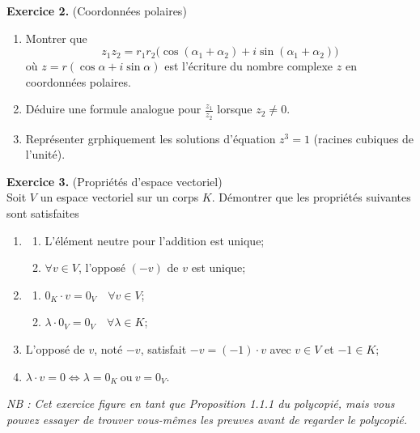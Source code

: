 \documentclass[a4paper, 10pt]{report}
\begin{document}
	\vspace{5mm}
	\noindent
	\textbf{Exercice 2.} (Coordonnées polaires)
	
	\begin{enumerate}[label=(\alph*)]
		\item Montrer que
		\[
			z_1z_2 = r_1r_2\big(\cos(\alpha_1 + \alpha_2)
				+ i\sin(\alpha_1 + \alpha_2)\big)
		\]
		où $z = r(\cos\alpha + i \sin\alpha)$ est l'écriture du
		nombre complexe $z$ en coordonnées polaires.
		\item Déduire une formule analogue pour $\frac{z_1}{z_2}$
		lorsque $z_2 \neq 0$.
		\item Représenter grphiquement les solutions d'équation
		$z^3 = 1$ (racines cubiques de l'unité).
	\end{enumerate}
	
	\vspace{5mm}
	\noindent
	\textbf{Exercice 3.} (Propriétés d'espace vectoriel)\\
	Soit $V$ un espace vectoriel sur un corps $K$. Démontrer que les
	propriétés suivantes sont satisfaites
	
	\begin{enumerate}[label=\arabic*.]
		\item \begin{enumerate}[label=(\alph*)]
			\item L'élément neutre pour l'addition est unique;
			\item $\forall v \in V$, l'opposé $(-v)$ de $v$ est unique;
		\end{enumerate}
		\item \begin{enumerate}[label=(\alph*)]
			\item $0_K \cdot v = 0_V \quad \forall v \in V$;
			\item $\lambda \cdot 0_V = 0_V \quad \forall \lambda \in K$;
		\end{enumerate}
		\item L'opposé de $v$, noté $-v$, satisfait $-v = (-1) \cdot v$
		avec $v \in V$ et $-1 \in K$;
		\item $\lambda \cdot v = 0 \iff
			\lambda = 0_K \ \text{ou}\ v = 0_V$.
	\end{enumerate}
		
	\noindent
	\textit{NB : Cet exercice figure en tant que Proposition 1.1.1 du
		polycopié, mais vous pouvez essayer de trouver vous-mêmes
		les preuves avant de regarder le polycopié.}
	
	\newpage
	
\end{document}
